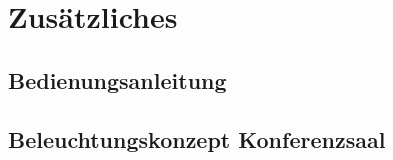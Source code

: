 \documentclass[
    headings=optiontotocandhead,%
    twoside,
    numbers=noenddot,%
    toc=flat, %
    12pt, %
    titlepage, %
    parskip=full, %
    listof=totoc, %
    listof=flat, %
    numbers=noenddot, %
    bibliography=totoc, %
    a4paper,DIV=14,
    BCOR=15mm,
]{scrbook}
\begin{document}
\chapter{Zusätzliches}\label{Zusätzliches}

\section{Bedienungsanleitung}\label{Bedienungsanleitung}

\renewcommand{\kapitelautor}{Autor: Clemens Scharwitzl}

% 

\section{Beleuchtungskonzept Konferenzsaal}\label{Beleuchtungskonzept-Konferenzsaal}

\renewcommand{\kapitelautor}{Autor: Clemens Scharwitzl}

% 






% 




% 
\end{document}
